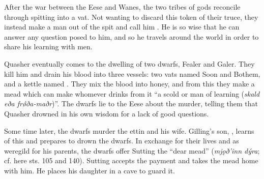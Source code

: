 	{\small After the war between the Eese and Wanes, the two tribes of gods reconcile through spitting into a vat. Not wanting to discard this token of their truce, they instead make a man out of the spit and call him .  He is so wise that he can answer any question posed to him, and so he travels around the world in order to share his learning with men.

	Quasher eventually comes to the dwelling of two dwarfs, Fealer and Galer. They kill him and drain his blood into three vessels: two vats named Soon and Bothem, and a kettle named . They mix the blood into honey, and from this they make a mead which can make whomever drinks from it “a scold or man of learning (\emph{skald eða frǿða-maðr})”.  The dwarfs lie to the Eese about the murder, telling them that Quasher drowned in his own wisdom for a lack of good questions.

	Some time later, the dwarfs murder the ettin  and his wife. Gilling’s son, , learns of this and prepares to drown the dwarfs. In exchange for their lives and as weregild for his parents, the dwarfs offer Sutting the “dear mead” (\emph{mjǫð’inn dýra}; cf. here sts. 105 and 140). Sutting accepts the payment and takes the mead home with him. He places his daughter  in a cave to guard it.}

